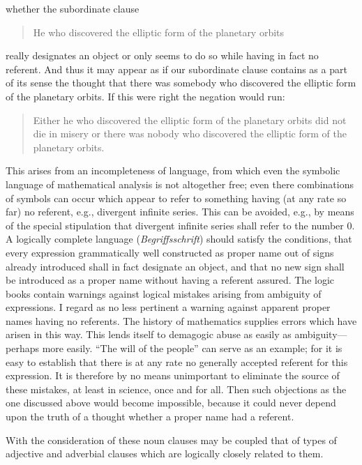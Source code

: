 \documentclass[twoside,12pt]{article}
\begin{document}
\noindent whether the subordinate clause

\begin{quote}
  He who discovered the elliptic form of the planetary orbits
\end{quote}

\noindent really designates an object or only seems to do so while
having in fact no referent. And thus it may appear as if our
subordinate clause contains as a part of its sense the thought that
there was somebody who discovered the elliptic form of the planetary
orbits. If this were right the negation would run:

\begin{quote}
  Either he who discovered the elliptic form of the planetary orbits
  did not die in misery or there was nobody who discovered the
  elliptic form of the planetary orbits.
\end{quote}

\noindent {} This arises from an incompleteness of
language, from which even the symbolic language of mathematical
analysis is not altogether free; even there combinations of symbols
can occur which appear to refer to something having (at any rate so
far) no referent, e.g., divergent infinite series. This can be
avoided, e.g., by means of the special stipulation that divergent
infinite series shall refer to the
number 0. A logically complete language ({\it Begriffsschrift}) should
satisfy the conditions, that every expression grammatically well
constructed as proper name out of signs already introduced shall in
fact designate an object, and that no new sign shall be introduced as
a proper name without having a referent assured. The logic books
contain warnings against logical mistakes arising from ambiguity of
expressions. I regard as no less pertinent a warning against apparent
proper names having no referents. The history of mathematics supplies
errors which have arisen in this way. This lends itself to demagogic
abuse as easily as ambiguity---perhaps more easily. ``The will of the
people'' can serve as an example; for it is easy to establish that
there is at any rate no generally accepted referent for this
expression. It is therefore by no means unimportant to eliminate the
source of these mistakes, at least in science, once and for all. Then
such objections as the one discussed above would become impossible,
because it could never depend upon the truth of a thought whether a
proper name had a referent.

With the consideration of these noun clauses may be coupled that of
types of adjective and adverbial clauses which are logically closely
related to them.
\end{document}
